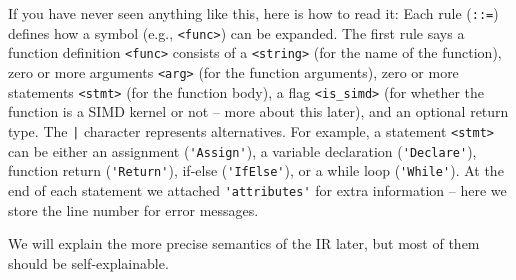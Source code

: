 If you have never seen anything like this, here is how to read it:
Each rule (\lstinline{::=}) defines how a symbol (e.g., \lstinline{<func>}) can be expanded. The first rule says a function definition \lstinline{<func>} consists of a \lstinline{<string>} (for the name of the function), zero or more arguments \lstinline{<arg>} (for the function arguments), zero or more statements \lstinline{<stmt>} (for the function body), a flag \lstinline{<is_simd>} (for whether the function is a SIMD kernel or not -- more about this later), and an optional return type. The \lstinline{|} character represents alternatives. For example, a statement \lstinline{<stmt>} can be either an assignment (\lstinline{'Assign'}), a variable declaration (\lstinline{'Declare'}), function return (\lstinline{'Return'}), if-else (\lstinline{'IfElse'}), or a while loop (\lstinline{'While'}). At the end of each statement we attached \lstinline{'attributes'} for extra information -- here we store the line number for error messages.

We will explain the more precise semantics of the IR later, but most of them should be self-explainable.

